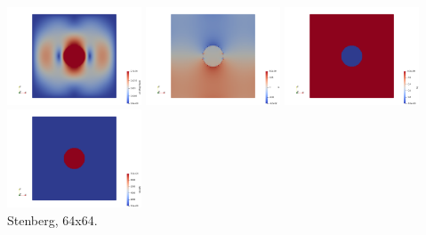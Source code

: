 \begin{center}
\includegraphics[width=4cm]{python_codes/fieldstone_78/results/exp03/vel}
\includegraphics[width=4cm]{python_codes/fieldstone_78/results/exp03/p}
\includegraphics[width=4cm]{python_codes/fieldstone_78/results/exp03/by}
\includegraphics[width=4cm]{python_codes/fieldstone_78/results/exp03/viscosity}\\
{\captionfont Stenberg, 64x64.}
\end{center}

